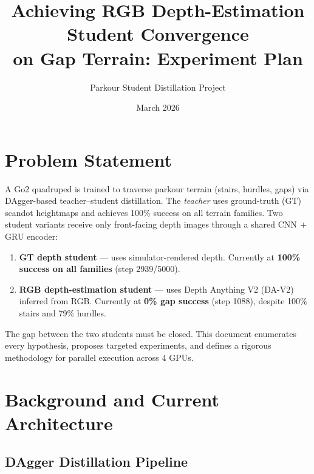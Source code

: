 \documentclass[11pt,a4paper]{article}
\title{Achieving RGB Depth-Estimation Student Convergence\\on Gap Terrain: Experiment Plan}
\author{Parkour Student Distillation Project}
\date{March 2026}
\begin{document}
\maketitle

\section{Problem Statement}

A Go2 quadruped is trained to traverse parkour terrain (stairs, hurdles,
gaps) via DAgger-based teacher--student distillation.  The \emph{teacher}
uses ground-truth (GT) scandot heightmaps and achieves 100\% success on all
terrain families.  Two student variants receive only front-facing depth
images through a shared CNN$\,+\,$GRU encoder:

\begin{enumerate}[nosep]
  \item \textbf{GT depth student} --- uses simulator-rendered depth.
        Currently at \textbf{100\% success on all families} (step 2939/5000).
  \item \textbf{RGB depth-estimation student} --- uses Depth Anything V2
        (DA-V2) inferred from RGB.  Currently at \textbf{0\% gap success}
        (step 1088), despite 100\% stairs and 79\% hurdles.
\end{enumerate}

The gap between the two students must be closed.  This document enumerates
every hypothesis, proposes targeted experiments, and defines a rigorous
methodology for parallel execution across 4 GPUs.

\section{Background and Current Architecture}

\subsection{DAgger Distillation Pipeline}
\end{document}
